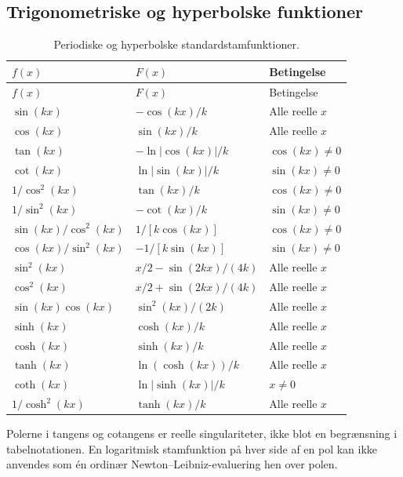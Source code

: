 \subsection{Trigonometriske og hyperbolske funktioner}
\begin{longtable}{@{}p{}p{}p{}@{}}
\caption{Periodiske og hyperbolske standardstamfunktioner.}\\
\toprule $f(x)$ & $F(x)$ & Betingelse\\\midrule\endfirsthead
\toprule $f(x)$ & $F(x)$ & Betingelse\\\midrule\endhead
$\sin(kx)$ & $-\cos(kx)/k$ & Alle reelle $x$\\[2mm]
$\cos(kx)$ & $\sin(kx)/k$ & Alle reelle $x$\\[2mm]
$\tan(kx)$ & $-\ln|\cos(kx)|/k$ & $\cos(kx)\ne0$\\[2mm]
$\cot(kx)$ & $\ln|\sin(kx)|/k$ & $\sin(kx)\ne0$\\[2mm]
$1/\cos^2(kx)$ & $\tan(kx)/k$ & $\cos(kx)\ne0$\\[2mm]
$1/\sin^2(kx)$ & $-\cot(kx)/k$ & $\sin(kx)\ne0$\\[2mm]
$\sin(kx)/\cos^2(kx)$ & $1/[k\cos(kx)]$ & $\cos(kx)\ne0$\\[2mm]
$\cos(kx)/\sin^2(kx)$ & $-1/[k\sin(kx)]$ & $\sin(kx)\ne0$\\[2mm]
$\sin^2(kx)$ & $x/2-\sin(2kx)/(4k)$ & Alle reelle $x$\\[2mm]
$\cos^2(kx)$ & $x/2+\sin(2kx)/(4k)$ & Alle reelle $x$\\[2mm]
$\sin(kx)\cos(kx)$ & $\sin^2(kx)/(2k)$ & Alle reelle $x$\\[2mm]
$\sinh(kx)$ & $\cosh(kx)/k$ & Alle reelle $x$\\[2mm]
$\cosh(kx)$ & $\sinh(kx)/k$ & Alle reelle $x$\\[2mm]
$\tanh(kx)$ & $\ln(\cosh(kx))/k$ & Alle reelle $x$\\[2mm]
$\coth(kx)$ & $\ln|\sinh(kx)|/k$ & $x\ne0$\\[2mm]
$1/\cosh^2(kx)$ & $\tanh(kx)/k$ & Alle reelle $x$\\
\bottomrule
\end{longtable}
Polerne i tangens og cotangens er reelle singulariteter, ikke blot en
begrænsning i tabelnotationen. En logaritmisk stamfunktion på hver side
af en pol kan ikke anvendes som én ordinær Newton--Leibniz-evaluering
hen over polen.

